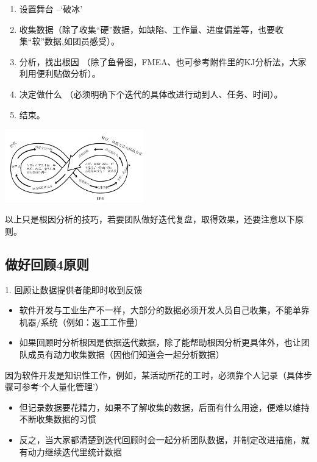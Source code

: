 \begin{enumerate}
\tightlist
\item
  设置舞台 --`破冰'
\item
  收集数据（除了收集“硬”数据，如缺陷、工作量、进度偏差等，也要收集“软”数据,如团员感受）。
\item
  分析，找出根因
  （除了鱼骨图，FMEA、也可参考附件里的KJ分析法，大家利用便利贴做分析）。
\item
  决定做什么 （必须明确下个迭代的具体改进行动到人、任务、时间）。
\item
  结束。
\end{enumerate}


\includegraphics[width=6cm]{RetrospectiveScreenshot_2021-09-21_173119.png}

以上只是根因分析的技巧，若要团队做好迭代复盘，取得效果，还要注意以下原则。

\hypertarget{ux505aux597dux56deux987e4ux539fux5219}{%
\subsection{做好回顾4原则}\label{ux505aux597dux56deux987e4ux539fux5219}}

1. 回顾让数据提供者能即时收到反馈\\


\begin{itemize}
\tightlist
\item
  软件开发与工业生产不一样，大部分的数据必须开发人员自己收集，不能单靠机器/系统（例如：返工工作量）
\item
  如果回顾时分析根因是依据迭代数据，除了能帮助根因分析更具体外，也让团队成员有动力收集数据（因他们知道会一起分析数据）
\end{itemize}

因为软件开发是知识性工作，例如，某活动所花的工时，必须靠个人记录（具体步骤可参考`个人量化管理'）

\begin{itemize}
\tightlist
\item
  但记录数据要花精力，如果不了解收集的数据，后面有什么用途，便难以维持不断收集数据的习惯
\item
  反之，当大家都清楚到迭代回顾时会一起分析团队数据，并制定改进措施，就有动力继续迭代里统计数据
\end{itemize}

